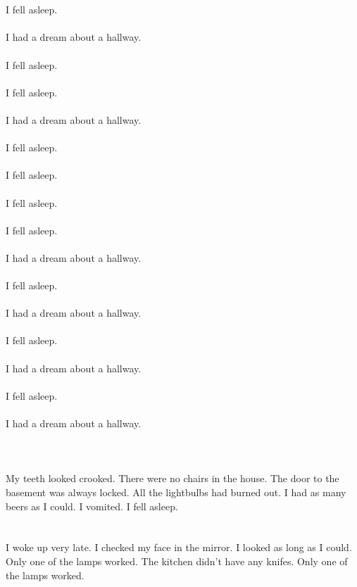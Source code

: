 \documentclass{article}
\begin{document}
    \section{}
    I fell asleep.\\\\I had a dream about a hallway.\\\\ I fell asleep.\\\\ I fell asleep.\\\\I had a dream about a hallway.\\\\ I fell asleep.\\\\ I fell asleep.\\\\ I fell asleep.\\\\ I fell asleep.\\\\I had a dream about a hallway.\\\\ I fell asleep.\\\\I had a dream about a hallway.\\\\ I fell asleep.\\\\I had a dream about a hallway.\\\\ I fell asleep.\\\\I had a dream about a hallway.\\\\ 
    \newpage
    
    \section{}
    My teeth looked crooked. There were no chairs in the house. The door to the basement was always locked. All the lightbulbs had burned out. I had as many beers as I could. I vomited. I fell asleep.  
    \newpage
    
    \section{}
    I woke up very late. I checked my face in the mirror. I looked as long as I could. Only one of the lamps worked. The kitchen didn't have any knifes. Only one of the lamps worked.  
    \newpage
    
\end{document}
